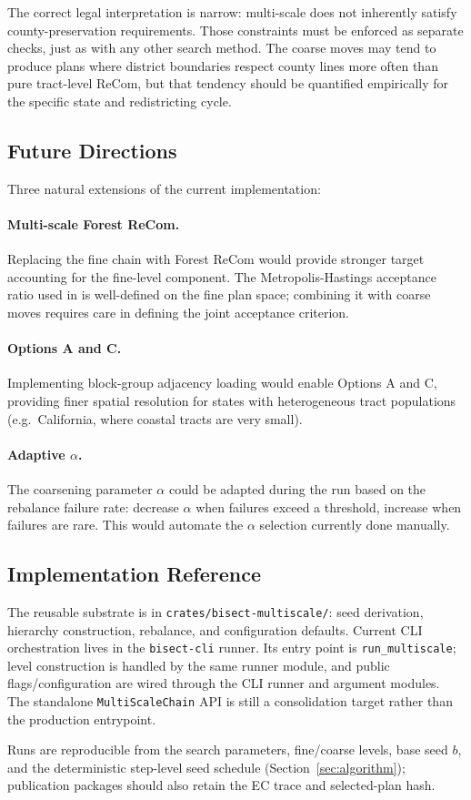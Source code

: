 The correct legal interpretation is narrow: multi-scale does not inherently
satisfy county-preservation requirements.
Those constraints must be enforced as separate checks, just as with any other
search method.
The coarse moves may tend to produce plans where district boundaries respect
county lines more often than pure tract-level ReCom, but that tendency should be
quantified empirically for the specific state and redistricting cycle.

\subsection{Future Directions}

Three natural extensions of the current implementation:

\paragraph{Multi-scale Forest ReCom.}
Replacing the fine \recom{} chain with Forest ReCom
\citep{dellaLibera2026forestRecom}
would provide stronger target accounting for the fine-level component.
The Metropolis-Hastings acceptance ratio used in \fr{} is well-defined on
the fine plan space; combining it with coarse moves requires care in
defining the joint acceptance criterion.

\paragraph{Options A and C.}
Implementing block-group adjacency loading would enable Options A and C,
providing finer spatial resolution for states with heterogeneous tract
populations (e.g.\ California, where coastal tracts are very small).

\paragraph{Adaptive $\alpha$.}
The coarsening parameter $\alpha$ could be adapted during the run based on
the rebalance failure rate: decrease $\alpha$ when failures exceed a threshold,
increase when failures are rare.
This would automate the $\alpha$ selection currently done manually.

\subsection{Implementation Reference}

The reusable substrate is in \texttt{crates/bisect-multiscale/}: seed
derivation, hierarchy construction, rebalance, and configuration defaults.
Current CLI orchestration lives in the \texttt{bisect-cli} runner. Its entry
point is \texttt{run\_multiscale}; level construction is handled by the same
runner module, and public flags/configuration are wired through the CLI runner
and argument modules.
The standalone \texttt{MultiScaleChain} API is still a consolidation target
rather than the production entrypoint.

Runs are reproducible from the search parameters, fine/coarse levels, base seed
$b$, and the deterministic step-level seed schedule
(Section~\ref{sec:algorithm}); publication packages should also retain the EC
trace and selected-plan hash.
